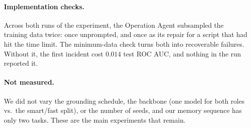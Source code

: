 \paragraph{Implementation checks.} Across both runs of the experiment, the Operation Agent subsampled the training data twice: once unprompted, and once as its repair for a script that had hit the time limit. The minimum-data check turns both into recoverable failures. Without it, the first incident cost $0.014$ test ROC AUC, and nothing in the run reported it.

\paragraph{Not measured.} We did not vary the grounding schedule, the backbone (one model for both roles vs.\ the smart/fast split), or the number of seeds, and our memory sequence has only two tasks. These are the main experiments that remain.
